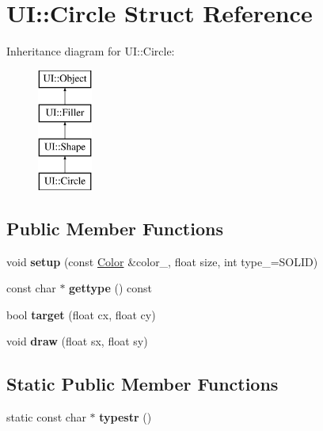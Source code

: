 \hypertarget{struct_u_i_1_1_circle}{}\section{UI\+:\+:Circle Struct Reference}
\label{struct_u_i_1_1_circle}
Inheritance diagram for UI\+:\+:Circle\+:\begin{figure}[H]
\begin{center}
\leavevmode
\includegraphics[height=4.000000cm]{struct_u_i_1_1_circle}
\end{center}
\end{figure}
\subsection*{Public Member Functions}
\begin{DoxyCompactItemize}
\item 
\mbox{\label{struct_u_i_1_1_circle_a5600f155916282d150f5001dc4eee7bf}} 
void {\bfseries setup} (const \hyperlink{struct_u_i_1_1_color}{Color} \&color\+\_\+, float size, int type\+\_\+=S\+O\+L\+ID)
\item 
\mbox{\label{struct_u_i_1_1_circle_a992cb6f90c9e5d847385ccc0dce4feeb}} 
const char $\ast$ {\bfseries gettype} () const
\item 
\mbox{\label{struct_u_i_1_1_circle_a3b333027c89114c07bf84110b3999502}} 
bool {\bfseries target} (float cx, float cy)
\item 
\mbox{\label{struct_u_i_1_1_circle_abcc7f2fb85dbae67eec9cc5cf8943a50}} 
void {\bfseries draw} (float sx, float sy)
\end{DoxyCompactItemize}
\subsection*{Static Public Member Functions}
\begin{DoxyCompactItemize}
\item 
\mbox{\label{struct_u_i_1_1_circle_a01fcff8f643bfc84135d449d01317868}} 
static const char $\ast$ {\bfseries typestr} ()
\end{DoxyCompactItemize}
